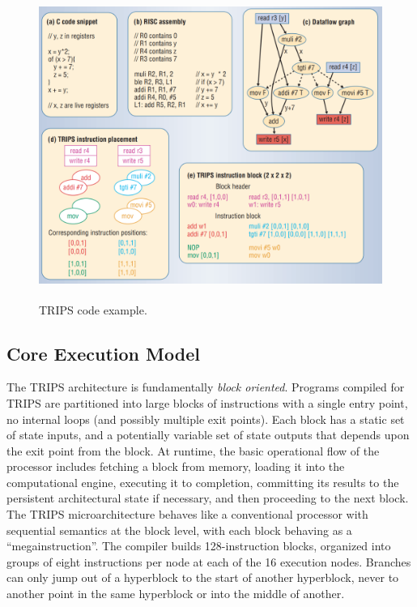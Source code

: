 \documentclass[UTF8,12pt,a4paper]{article}
\begin{document}
\begin{figure}[htb]
  \begin{small}
    \begin{center}
      \includegraphics[width=\textwidth,height=10cm]{figures/ieee_computer_trips_code.png}
    \end{center}
    \caption{TRIPS code example.}
    \label{fig:trips_code}
  \end{small}
\end{figure}

\subsection{Core Execution Model}
The TRIPS architecture is fundamentally \emph{block oriented}.
Programs compiled for TRIPS are partitioned into large blocks of instructions
with a single entry point, no internal loops (and possibly multiple exit points).
Each block has a static set of state inputs,
and a potentially variable set of state outputs
that depends upon the exit point from the block.
At runtime, the basic operational flow of the processor includes fetching a block from memory,
loading it into the computational engine, executing it to completion,
committing its results to the persistent architectural state if necessary,
and then proceeding to the next block.
The TRIPS microarchitecture behaves like a conventional processor with sequential semantics at the block level,
with each block behaving as a ``megainstruction''.
The compiler builds 128-instruction blocks,
organized into groups of eight instructions per node at each of the 16 execution nodes.
Branches can only jump out of a hyperblock to the start of another hyperblock,
never to another point in the same hyperblock or into the middle of another.
\end{document}
